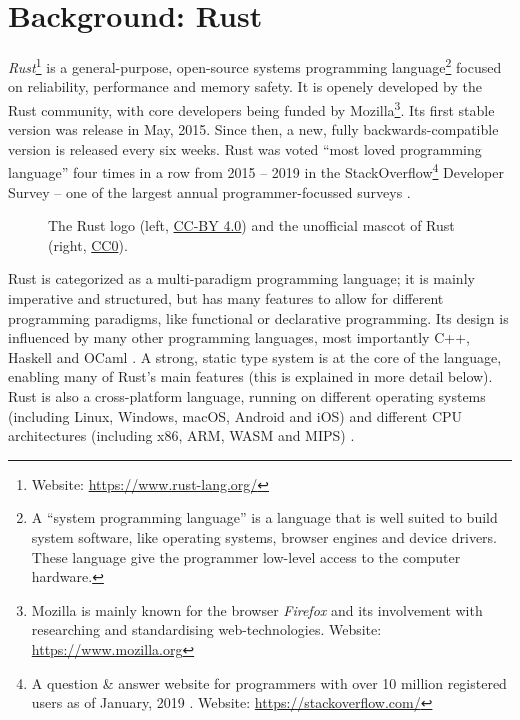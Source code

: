 \chapter{Background: Rust}

\emph{Rust}\footnote{Website: \url{https://www.rust-lang.org/}} is a general-purpose, open-source systems programming language\footnote{A \enquote{system programming language} is a language that is well suited to build system software, like operating systems, browser engines and device drivers. These language give the programmer low-level access to the computer hardware.} focused on reliability, performance and memory safety.
It is openely developed by the Rust community, with core developers being funded by Mozilla\footnote{Mozilla is mainly known for the browser \emph{Firefox} and its involvement with researching and standardising web-technologies. Website: \url{https://www.mozilla.org}}.
Its first stable version was release in May, 2015.
Since then, a new, fully backwards-compatible version is released every six weeks.
Rust was voted \enquote{most loved programming language} four times in a row from 2015 -- 2019 in the StackOverflow\footnote{A question \& answer website for programmers with over 10 million registered users as of January, 2019 \cite{so-user-count}. Website: \url{https://stackoverflow.com/}} Developer Survey -- one of the largest annual programmer-focussed surveys \cite{so-survey}.

\begin{figure}[h]
  \vspace{5mm}
  \centering
  
  \caption{The Rust logo (left, \protect\hyperlink{cc-by}{CC-BY 4.0}) and the unofficial mascot of Rust (right, \protect\hyperlink{cc0}{CC0}).}
  \vspace{5mm}
\end{figure}

Rust is categorized as a multi-paradigm programming language; it is mainly imperative and structured, but has many features to allow for different programming paradigms, like functional or declarative programming.
Its design is influenced by many other programming languages, most importantly C++, Haskell and OCaml \cite{rust-influences}.
A strong, static type system is at the core of the language, enabling many of Rust's main features (this is explained in more detail below).
Rust is also a cross-platform language, running on different operating systems (including Linux, Windows, macOS, Android and iOS) and different CPU architectures (including x86, ARM, WASM and MIPS) \cite{rust-platforms}.


